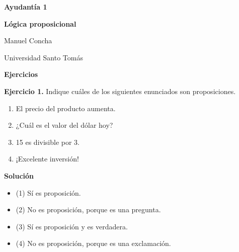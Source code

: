\documentclass[11pt]{article}
\begin{document}
	
	\begin{center}
		
		{\LARGE\bfseries\textcolor{Titulo}{Ayudantía 1}}
		
		\vspace{3mm}
		
		{\large\bfseries\textcolor{Subtitulo}{Lógica proposicional}}
		
		\vspace{4mm}
		
		{\normalsize Manuel Concha}
		
		{\small Universidad Santo Tomás}
	\end{center}
	
	\vspace{8mm}
	
	{\Large\bfseries\textcolor{Titulo}{Ejercicios}}
	
	\vspace{4mm}
	
	\begin{ejercicio}
		\textbf{Ejercicio 1.} Indique cuáles de los siguientes enunciados son proposiciones.
		
		\begin{enumerate}[label=\arabic*.]
			\item El precio del producto aumenta.
			\item ¿Cuál es el valor del dólar hoy?
			\item 15 es divisible por 3.
			\item ¡Excelente inversión!
		\end{enumerate}
	\end{ejercicio}
	
	\begin{solucion}
		\textbf{Solución}
		
		\begin{itemize}
			\item (1) Sí es proposición.
			\item (2) No es proposición, porque es una pregunta.
			\item (3) Sí es proposición y es verdadera.
			\item (4) No es proposición, porque es una exclamación.
		\end{itemize}
	\end{solucion}
	
	\vspace{5mm}
	
\end{document}
